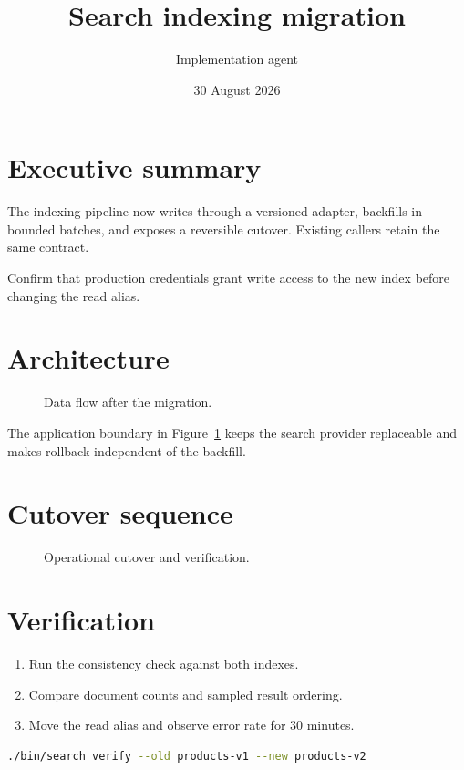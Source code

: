 \documentclass{texlr}
\title{Search indexing migration}
\author{Implementation agent}
\date{30 August 2026}
\begin{document}
\maketitle

\section{Executive summary}

The indexing pipeline now writes through a versioned adapter, backfills in
bounded batches, and exposes a reversible cutover. Existing callers retain the
same contract.

\begin{callout}
Confirm that production credentials grant write access to the new index before
changing the read alias.
\end{callout}

\section{Architecture}

\begin{figure}[ht]
  \centering
  \caption{Data flow after the migration.}
  \label{fig:architecture}
\end{figure}

The application boundary in Figure~\ref{fig:architecture} keeps the search
provider replaceable and makes rollback independent of the backfill.

\section{Cutover sequence}

\begin{figure}[ht]
  \centering
  \caption{Operational cutover and verification.}
\end{figure}


\section{Verification}

\begin{enumerate}
  \item Run the consistency check against both indexes.
  \item Compare document counts and sampled result ordering.
  \item Move the read alias and observe error rate for 30 minutes.
\end{enumerate}

\begin{lstlisting}[language=bash,caption={Agent verification command}]
./bin/search verify --old products-v1 --new products-v2
\end{lstlisting}
\end{document}
